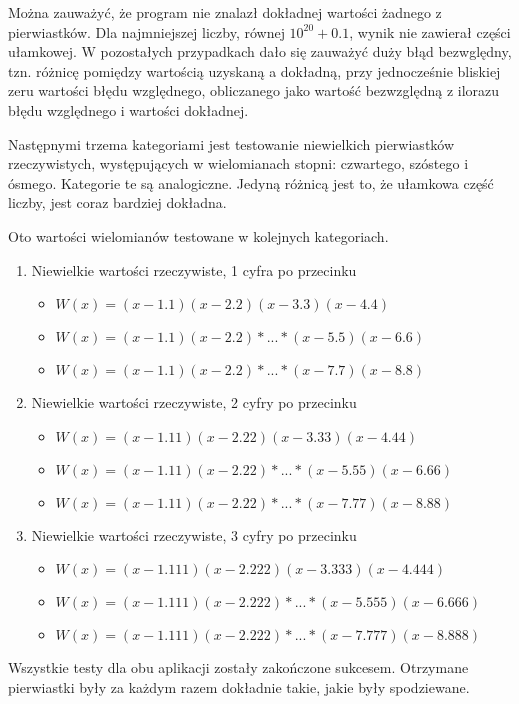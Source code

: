 Można zauważyć, że program nie znalazł dokładnej wartości żadnego z pierwiastków. Dla najmniejszej liczby, równej $10^{20}+0.1$, wynik nie zawierał części ułamkowej. W pozostałych przypadkach dało się zauważyć duży błąd bezwględny, tzn. różnicę pomiędzy wartością uzyskaną a dokładną, przy jednocześnie bliskiej zeru wartości błędu względnego, obliczanego jako wartość bezwzględną z ilorazu błędu względnego i wartości dokładnej.

Następnymi trzema kategoriami jest testowanie niewielkich pierwiastków rzeczywistych, występujących w wielomianach stopni: czwartego, szóstego i ósmego. Kategorie te są analogiczne. Jedyną różnicą jest to, że ułamkowa część liczby, jest coraz bardziej dokładna.

Oto wartości wielomianów testowane w kolejnych kategoriach.

\begin{enumerate}
	\item Niewielkie wartości rzeczywiste, 1 cyfra po przecinku
	\begin{itemize}
		\item $W(x)=(x-1.1)(x-2.2)(x-3.3)(x-4.4)$
		\item $W(x)=(x-1.1)(x-2.2)*...*(x-5.5)(x-6.6)$
		\item $W(x)=(x-1.1)(x-2.2)*...*(x-7.7)(x-8.8)$
	\end{itemize}
	\item Niewielkie wartości rzeczywiste, 2 cyfry po przecinku
	\begin{itemize}
		\item $W(x)=(x-1.11)(x-2.22)(x-3.33)(x-4.44)$
		\item $W(x)=(x-1.11)(x-2.22)*...*(x-5.55)(x-6.66)$
		\item $W(x)=(x-1.11)(x-2.22)*...*(x-7.77)(x-8.88)$
	\end{itemize}
	\item Niewielkie wartości rzeczywiste, 3 cyfry po przecinku
	\begin{itemize}
		\item $W(x)=(x-1.111)(x-2.222)(x-3.333)(x-4.444)$
		\item $W(x)=(x-1.111)(x-2.222)*...*(x-5.555)(x-6.666)$
		\item $W(x)=(x-1.111)(x-2.222)*...*(x-7.777)(x-8.888)$
	\end{itemize}
\end{enumerate}

Wszystkie testy dla obu aplikacji zostały zakończone sukcesem. Otrzymane pierwiastki były za każdym razem dokładnie takie, jakie były spodziewane.

